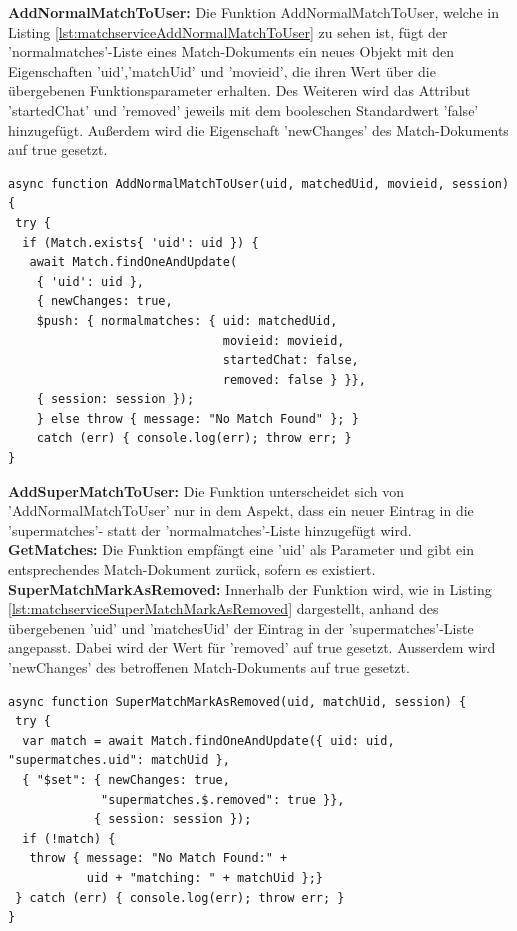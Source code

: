 \noindent
\textbf{AddNormalMatchToUser:}
Die Funktion AddNormalMatchToUser, welche in Listing \ref{lst:matchserviceAddNormalMatchToUser} zu sehen ist,  fügt der 'normalmatches'-Liste eines Match-Dokuments ein neues Objekt mit den Eigenschaften 'uid','matchUid' und 'movieid', die ihren Wert über die übergebenen Funktionsparameter erhalten. Des Weiteren wird das Attribut 'startedChat' und 'removed' jeweils mit dem booleschen Standardwert 'false' hinzugefügt. Außerdem wird die Eigenschaft 'newChanges' des Match-Dokuments auf true gesetzt.\\

\begin{lstlisting}[caption=Match Service - AddNormalMatchToUser, label=lst:matchserviceAddNormalMatchToUser]
async function AddNormalMatchToUser(uid, matchedUid, movieid, session) {
 try {
  if (Match.exists{ 'uid': uid }) {
   await Match.findOneAndUpdate(
    { 'uid': uid },
    { newChanges: true,
    $push: { normalmatches: { uid: matchedUid, 
                              movieid: movieid, 
                              startedChat: false, 
                              removed: false } }},
    { session: session });
    } else throw { message: "No Match Found" }; }
    catch (err) { console.log(err); throw err; }
}
\end{lstlisting}

\noindent
\textbf{AddSuperMatchToUser:}
Die Funktion unterscheidet sich von 'AddNormalMatchToUser' nur in dem Aspekt, dass ein neuer Eintrag in die 'supermatches'- statt der 'normalmatches'-Liste hinzugefügt wird.\\

\noindent
\textbf{GetMatches:}
Die Funktion empfängt eine 'uid' als Parameter und gibt ein entsprechendes Match-Dokument zurück, sofern es existiert.\\

\noindent
\textbf{SuperMatchMarkAsRemoved:}
Innerhalb der Funktion wird, wie in Listing \ref{lst:matchserviceSuperMatchMarkAsRemoved} dargestellt, anhand des übergebenen 'uid' und 'matchesUid' der Eintrag in der 'supermatches'-Liste angepasst. Dabei wird der Wert für 'removed' auf true gesetzt. Ausserdem wird 'newChanges' des betroffenen Match-Dokuments auf true gesetzt.\\

\begin{lstlisting}[caption=Match Service - SuperMatchMarkAsRemoved, label=lst:matchserviceSuperMatchMarkAsRemoved]
async function SuperMatchMarkAsRemoved(uid, matchUid, session) {
 try {
  var match = await Match.findOneAndUpdate({ uid: uid, "supermatches.uid": matchUid },
  { "$set": { newChanges: true,
             "supermatches.$.removed": true }},
            { session: session });
  if (!match) {
   throw { message: "No Match Found:" + 
           uid + "matching: " + matchUid };}
 } catch (err) { console.log(err); throw err; }
}
\end{lstlisting}

